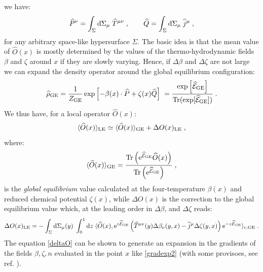 \documentclass[prd,superscriptaddress,nofootinbib,notitlepage]{revtex4-1}
\def\wT{{\widehat T}}
\def\wj{{\widehat j}}
\def\wP{{\widehat P}}
\def\wQ{{\widehat Q}}
\def\wE{{\widehat{\cal E}}}
\def\wrho{{\widehat{\rho}}}
\def\wO{\widehat O}
\def\wQ{\widehat Q}
\newcommand{\Tr}{{\rm Tr}}
\newcommand{\e}{{\rm e}}
\newcommand{\di}{{\rm d}}
\newcommand{\be}{\begin{equation}}
\newcommand{\ee}{\end{equation}}
\begin{document}
%
we have:
%
$$
 \wP^\nu = \int_\Sigma \di \Sigma_\mu \; \wT^{\mu\nu}\;,  \qquad \wQ = \int_\Sigma \di \Sigma_\mu \; \wj^{\mu}\;,
$$
%
for any arbitrary space-like hypersurface $\Sigma$.
The basic idea is that the mean value of $\wO(x)$ is mostly determined by the values of the thermo-hydrodynamic fields 
$\beta$ and $\zeta$ around $x$ if they are slowly varying. Hence, if $\Delta \beta$ and $\Delta \zeta$ are not large we 
can expand the density operator around the global equilibrium configuration:
%
\be\label{geq}
 \wrho_{\rm GE} = \frac{1}{Z_{\rm GE}}\exp\left[-\beta(x) \cdot \wP + \zeta(x) \wQ \right]\;
= \frac{\exp\left[\wE_{\rm GE}\right]}{\Tr(\exp[\wE_{\rm GE}])}\;.
\ee
%
We thus have, for a local operator $\wO(x)$:
%
\begin{equation}\label{lrtO}
    \langle\wO(x)\rangle_{\rm LE} \simeq \langle\wO(x)\rangle_{\rm GE}+ \Delta O(x)_{\rm LE}\;,
\end{equation}
%
where:
%
\begin{equation*}
    \langle\wO(x)\rangle_{\rm GE}= \frac{\Tr \left(\e^{\wE_{\rm GE}} \wO(x) \right)}
    {\Tr\left( \e^{\wE_{\rm GE}}\right)}\;,
\end{equation*}
%
is the {\em global equilibrium} value calculated at the four-temperature $\beta(x)$ and reduced chemical potential 
$\zeta(x)$, while $\Delta O(x)$ is the correction to the global equilibrium value which, at the leading order
in $\Delta\beta$, and $\Delta \zeta$ reads:
%
\begin{equation}\label{deltaO}
    \Delta O(x)_{\rm LE}=-\int_{\Sigma}\di\Sigma_\mu(y) \; \int^1_0\di z \; \langle\wO(x),
    \e^{z\wE_{\rm GE}}\left(\wT^{\mu\nu}(y)\Delta\beta_\nu(y,x)-\wj^\mu\Delta\zeta(y,x)\right)\e^{-z\wE_{\rm GE}}
    \rangle_{c,\mathrm{GE}} \;.
\end{equation}
%
The equation \eqref{deltaO} can be shown to generate an expansion in the gradients of the fields $\beta,\zeta,n$ evaluated
in the point $x$ like \eqref{gradexp2} (with some provisoes, see ref. \cite{Sheng:2025cjk}). 
\end{document}
